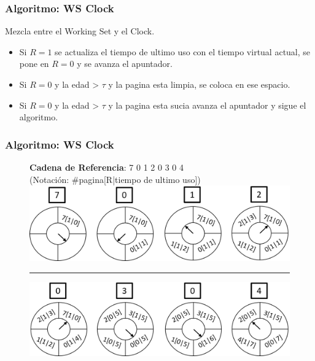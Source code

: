 \documentclass{beamer}
\newcommand{\algTitle}{\textbf{Algoritmo:} }
\begin{document}
\begin{frame}
	\frametitle{\algTitle WS Clock}

	Mezcla entre el Working Set y el Clock.
	\begin{itemize}
		\item Si $R = 1$ se actualiza el tiempo de ultimo uso con el tiempo virtual actual, se pone en $R=0$ y se avanza el apuntador.
		\item Si $R = 0$ y la edad > $\tau$ y la pagina esta limpia, se coloca en ese espacio.
		\item Si $R = 0$ y la edad > $\tau$ y la pagina esta sucia avanza el apuntador y sigue el algoritmo.
	\end{itemize}
\end{frame}

\begin{frame}
	\frametitle{\algTitle WS Clock}
	
	\begin{figure}[H]
		\textbf{Cadena de Referencia}: 7 0 1 2 0 3 0 4 \\
		 \footnotesize (Notación: \#pagina[R|tiempo de ultimo uso])
		\includegraphics[scale=0.5]{img/wsclockr1.png} 
		\\ \hrule
		\includegraphics[scale=0.5]{img/wsclockr2.png}
	\end{figure}
\end{frame}

\end{document}
